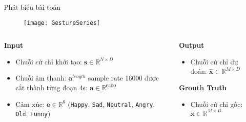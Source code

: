 \begin{frame}{Phát biểu bài toán}


 \begin{figure}[h]
	\centering
	\texttt{[image: GestureSeries]}
\end{figure}

\vspace{-10pt}

\begin{columns}
	
	\begin{column}{0.6\textwidth}
		
		\textbf{Input}
		\begin{itemize}
			\item Chuỗi cử chỉ khởi tạo: $\mathbf{s} \in \mathbb{R}^{N \times D}$
			\item Chuỗi âm thanh: $\mathbf{a}^{length}$ sample rate 16000 được cắt thành từng đoạn 4s: $\mathbf{a} \in \mathbb{R}^{6400}$
			\item Cảm xúc: $\mathbf{e} \in \mathbb{R}^6$ (\texttt{Happy},  \texttt{Sad},  \texttt{Neutral}, \texttt{Angry}, \texttt{Old}, \texttt{Funny})
		\end{itemize}
		
	\end{column}
	\begin{column}{0.4\textwidth}
		 \textbf{Output}
		 \begin{itemize}
		 	\item Chuỗi cử chỉ dự đoán: $\hat{\mathbf{x}} \in \mathbb{R}^{M \times D}$
		 \end{itemize}
		 
		 \textbf{Grouth Truth}
		 \begin{itemize}
		 	\item Chuỗi cử chỉ gốc: $ \mathbf{x}  \in \mathbb{R}^{M \times D}$
		 \end{itemize}
	\end{column}
\end{columns}

\end{frame}

